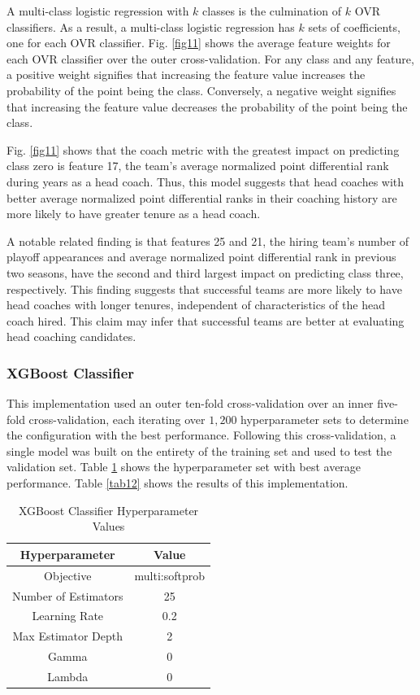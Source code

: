 \documentclass[conference]{IEEEtran}
\begin{document}
A multi-class logistic regression with $k$ classes is the culmination of $k$ OVR classifiers. As a result, a multi-class logistic regression has $k$ sets of coefficients, one for each OVR classifier. Fig. \ref{fig11} shows the average feature weights for each OVR classifier over the outer cross-validation. For any class and any feature, a positive weight signifies that increasing the feature value increases the probability of the point being the class. Conversely, a negative weight signifies that increasing the feature value decreases the probability of the point being the class. 

Fig. \ref{fig11} shows that the coach metric with the greatest impact on predicting class zero is feature 17, the team's average normalized point differential rank during years as a head coach. Thus, this model suggests that head coaches with better average normalized point differential ranks in their coaching history are more likely to have greater tenure as a head coach. 

A notable related finding is that features 25 and 21, the hiring team's number of playoff appearances and average normalized point differential rank in previous two seasons, have the second and third largest impact on predicting class three, respectively. This finding suggests that successful teams are more likely to have head coaches with longer tenures, independent of characteristics of the head coach hired. This claim may infer that successful teams are better at evaluating head coaching candidates. 

\subsubsection{XGBoost Classifier}
This implementation used an outer ten-fold cross-validation over an inner five-fold cross-validation, each iterating over $1,200$ hyperparameter sets to determine the configuration with the best performance. Following this cross-validation, a single model was built on the entirety of the training set and used to test the validation set. Table \ref{tab11} shows the hyperparameter set with best average performance. Table \ref{tab12} shows the results of this implementation.

\begin{table}[htbp]
\caption{XGBoost Classifier Hyperparameter Values}
\begin{center}
\begin{tabular}{|c||c|}
\hline
\textbf{Hyperparameter} & \textbf{Value} \\
\hline
\hline
Objective & multi:softprob \\
\hline
Number of Estimators & 25 \\
\hline
Learning Rate & 0.2 \\
\hline
Max Estimator Depth & 2 \\
\hline
Gamma & 0 \\
\hline
Lambda & 0 \\
\hline
\end{tabular}
\label{tab11}
\end{center}
\end{table}
\end{document}
